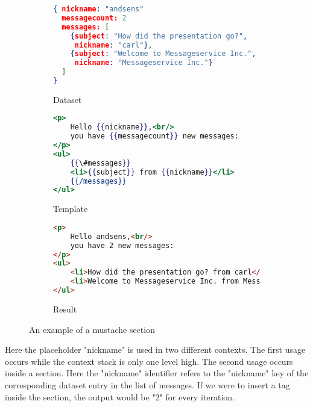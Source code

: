 \documentclass[thesis.tex]{subfiles}
\begin{document}
\begin{figure}
	\centering
	\begin{subfigure}{\linewidth}
		\caption{Dataset}
		\label{fig:section-example.json}
		\begin{lstlisting}[language=JSON]
{ nickname: "andsens"
  messagecount: 2
  messages: [
  	{subject: "How did the presentation go?",
  	 nickname: "carl"},
  	{subject: "Welcome to Messageservice Inc.",
  	 nickname: "Messageservice Inc."}
  ]
}
		\end{lstlisting}
	\end{subfigure}
	
	\begin{subfigure}{\linewidth}
		\caption{Template}
		\label{fig:section-example.mustache}
		\begin{lstlisting}[language=mustache]
<p>
	Hello {{nickname}},<br/>
	you have {{messagecount}} new messages:
</p>
<ul>
	{{\#messages}}
	<li>{{subject}} from {{nickname}}</li>
	{{/messages}}
</ul>
		\end{lstlisting}
	\end{subfigure}
	
	\begin{subfigure}{\linewidth}
		\caption{Result}
		\label{fig:section-example.html}
		\begin{lstlisting}[language=HTML]
<p>
	Hello andsens,<br/>
	you have 2 new messages:
</p>
<ul>
	<li>How did the presentation go? from carl</li>
	<li>Welcome to Messageservice Inc. from Messageservice Inc.</li>
</ul>
		\end{lstlisting}
	\end{subfigure}
	\caption{An example of a mustache section}
	\label{fig:section-example}
\end{figure}
Here the placeholder "nickname" is used in two different contexts.
The first usage occurs while the context stack is only one level high.
The second usage occurs inside a section. Here the "nickname" identifier refers
to the "nickname" key of the corresponding dataset entry in the list of messages.
If we were to insert a  tag inside the section,
the output would be "2" for every iteration.
\end{document}
